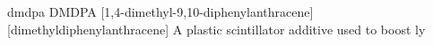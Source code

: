 \newglsXchemical%
{dmdpa}%
{DMDPA}%
[1,4-dimethyl-9,10-diphenylanthracene]%
{}%
[dimethyldiphenylanthracene]%
{A plastic scintillator additive used to boost \gls{ly}}%